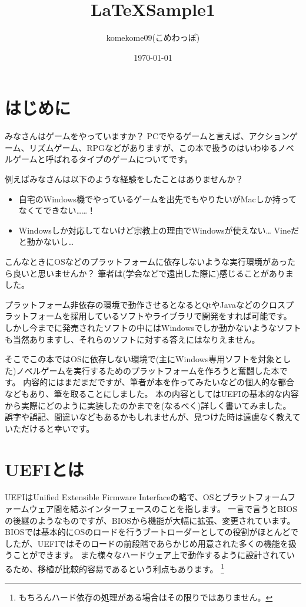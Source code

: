\documentclass[10pt, b5paper, openany]{ltjsbook}
\title{ \LaTeX Sample1 }
\author{ komekome09(こめわっぽ) }
\date{ \today }
\begin{document}
\chapter*{はじめに}
みなさんはゲームをやっていますか？
PCでやるゲームと言えば、アクションゲーム、リズムゲーム、RPGなどがありますが、この本で扱うのはいわゆるノベルゲームと呼ばれるタイプのゲームについてです。

例えばみなさんは以下のような経験をしたことはありませんか？
\begin{itemize}
    \item 自宅のWindows機でやっているゲームを出先でもやりたいがMacしか持ってなくてできない……！
    \item Windowsしか対応してないけど宗教上の理由でWindowsが使えない… Vineだと動かないし…
\end{itemize}
こんなときにOSなどのプラットフォームに依存しないような実行環境があったら良いと思いませんか？
筆者は(学会などで遠出した際に)感じることがありました。

プラットフォーム非依存の環境で動作させるとなるとQtやJavaなどのクロスプラットフォームを採用しているソフトやライブラリで開発をすれば可能です。
しかし今までに発売されたソフトの中にはWindowsでしか動かないようなソフトも当然ありますし、それらのソフトに対する答えにはなりえません。

そこでこの本ではOSに依存しない環境で(主にWindows専用ソフトを対象とした)ノベルゲームを実行するためのプラットフォームを作ろうと奮闘した本です。
内容的にはまだまだですが、筆者が本を作ってみたいなどの個人的な都合などもあり、筆を取ることにしました。
本の内容としてはUEFIの基本的な内容から実際にどのように実装したのかまでを(なるべく)詳しく書いてみました。
誤字や誤記、間違いなどもあるかもしれませんが、見つけた時は遠慮なく教えていただけると幸いです。

\tableofcontents
\clearpage

\chapter{UEFIとは}
UEFIはUnified Extensible Firmware Interfaceの略で、OSとプラットフォームファームウェア間を結ぶインターフェースのことを指します。
一言で言うとBIOSの後継のようなものですが、BIOSから機能が大幅に拡張、変更されています。
BIOSでは基本的にOSのロードを行うブートローダーとしての役割がほとんどでしたが、UEFIではそのロードの前段階であらかじめ用意された多くの機能を扱うことができます。
また様々なハードウェア上で動作するように設計されているため、移植が比較的容易であるという利点もあります。
\footnote{もちろんハード依存の処理がある場合はその限りではありません。}
\end{document}
